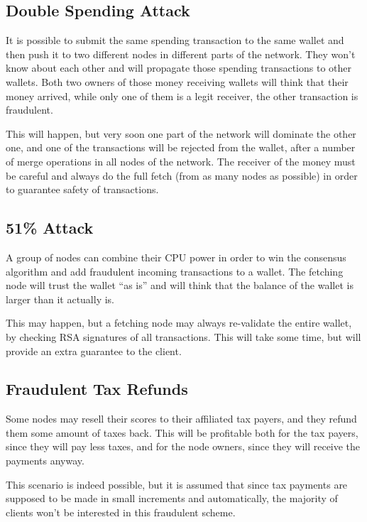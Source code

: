 \documentclass[11pt,oneside]{article}
\begin{document}
\subsection{Double Spending Attack}

It is possible to submit the same spending transaction to the same wallet
and then push it to two different nodes in different parts of the network.
They won't know about each other and will propagate those spending
transactions to other wallets. Both two owners of those money receiving
wallets will think that their money arrived, while only one of them is
a legit receiver, the other transaction is fraudulent.

This will happen, but very soon one part of the network will dominate the other
one, and one of the transactions will be rejected from the wallet, after
a number of merge operations in all nodes of the network. The receiver of the
money must be careful and always do the full fetch (from as many nodes
as possible) in order to guarantee safety of transactions.

\subsection{51\% Attack}

A group of nodes can combine their CPU power in order to win the consensus
algorithm and add fraudulent incoming transactions to a wallet.
The fetching node will trust the wallet ``as is'' and will think that the
balance of the wallet is larger than it actually is.

This may happen, but a fetching node may always re-validate the entire wallet,
by checking RSA signatures of all transactions. This will take some time, but will
provide an extra guarantee to the client.

\subsection{Fraudulent Tax Refunds}

Some nodes may resell their scores to their affiliated tax payers, and they
refund them some amount of taxes back. This will be profitable both for
the tax payers, since they will pay less taxes, and for the node owners,
since they will receive the payments anyway.

This scenario is indeed possible, but it is assumed that since tax payments are
supposed to be made in small increments and automatically, the majority of
clients won't be interested in this fraudulent scheme.
\end{document}
